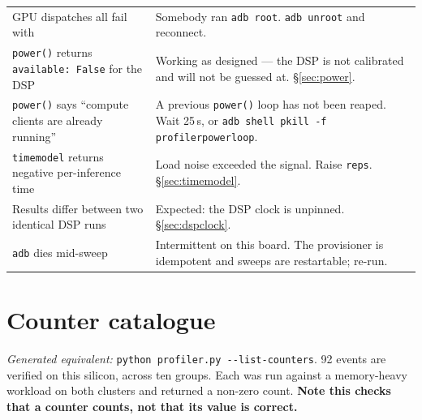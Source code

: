 \documentclass[11pt,a4paper]{article}
\newcommand{\code}[1]{\texttt{\let\_\breakableunderscore #1}}
\newcommand{\breakableunderscore}{\textunderscore\allowbreak}
\begin{document}
\begin{longtable}{@{}p{5.1cm}p{9.6cm}@{}}
GPU dispatches all fail with \code{-1001} & Somebody ran \code{adb root}.
  \code{adb unroot} and reconnect. \\
\code{power()} returns \code{available: False} for the DSP & Working as
  designed --- the DSP is not calibrated and will not be guessed at.
  \S\ref{sec:power}. \\
\code{power()} says ``compute clients are already running'' & A previous
  \code{power()} loop has not been reaped. Wait 25\,s, or
  \code{adb shell pkill -f profiler\_power\_loop}. \\
\code{time\_model} returns negative per-inference time & Load noise exceeded
  the signal. Raise \code{reps}. \S\ref{sec:timemodel}. \\
Results differ between two identical DSP runs & Expected: the DSP clock is
  unpinned. \S\ref{sec:dspclock}. \\
\code{adb} dies mid-sweep & Intermittent on this board. The provisioner is
  idempotent and sweeps are restartable; re-run. \\
\bottomrule
\end{longtable}

\appendix
\section{Counter catalogue}
\label{sec:counterappendix}

\noindent\emph{Generated equivalent:} \code{python profiler.py -{}-list-counters}.
92 events are verified on this silicon, across ten groups. Each was run against
a memory-heavy workload on both clusters and returned a non-zero count.
\textbf{Note this checks that a
counter counts, not that its value is correct.}
\end{document}
